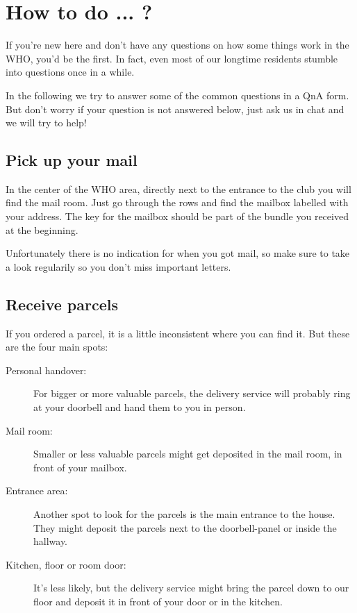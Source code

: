 \chapter{How to do ... ?} \label{chap:qna}
If you're new here and don't have any questions on how some things work in the WHO, you'd be the first. In fact, even most of our longtime residents stumble into questions once in a while.

In the following we try to answer some of the common questions in a QnA form. But don't worry if your question is not answered below, just ask us in chat and we will try to help!

\section{Pick up your mail}
In the center of the WHO area, directly next to the entrance to the club  you will find the mail room. Just go through the rows and find the mailbox labelled with your address. The key for the mailbox should be part of the bundle you received at the beginning. 

Unfortunately there is no indication for when you got mail, so make sure to take a look regularily so you don't miss important letters.

\section{Receive parcels}
If you ordered a parcel, it is a little inconsistent where you can find it. But these are the four main spots:
\begin{description}
    \item[Personal handover:] For bigger or more valuable parcels, the delivery service will probably ring at your doorbell and hand them to you in person.
    \item[Mail room:] Smaller or less valuable parcels might get deposited in the mail room, in front of your mailbox.
    \item[Entrance area:] Another spot to look for the parcels is the main entrance to the house. They might deposit the parcels next to the doorbell-panel or inside the hallway.
    \item[Kitchen, floor or room door:] It's less likely, but the delivery service might bring the parcel down to our floor and deposit it in front of your door or in the kitchen.
\end{description}

